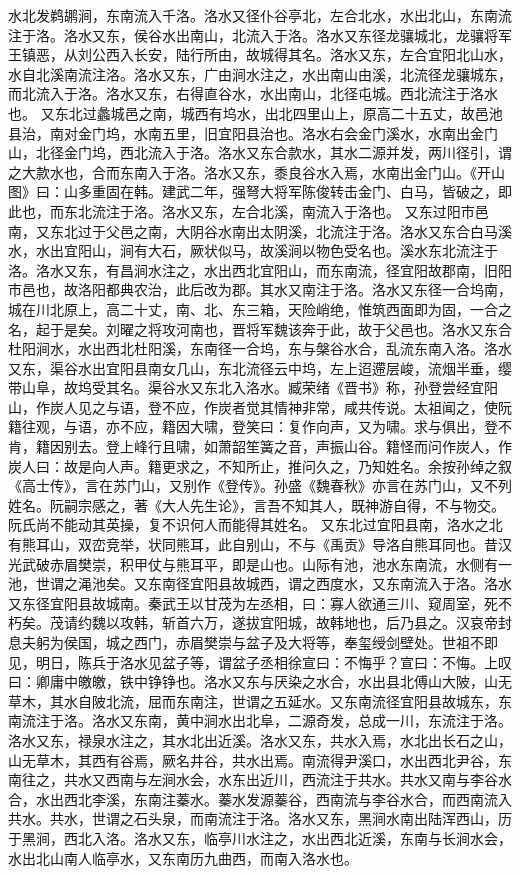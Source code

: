 \documentclass[12pt,UTF8]{ctexbook}
\begin{document}
水北发鹈鹕涧，东南流入千洛。洛水又径仆谷亭北，左合北水，水出北山，东南流注于洛。洛水又东，侯谷水出南山，北流入于洛。洛水又东径龙骧城北，龙骧将军王镇恶，从刘公西入长安，陆行所由，故城得其名。洛水又东，左合宜阳北山水，水自北溪南流注洛。洛水又东，广由涧水注之，水出南山由溪，北流径龙骧城东，而北流入于洛。洛水又东，右得直谷水，水出南山，北径屯城。西北流注于洛水也。
又东北过蠡城邑之南，城西有坞水，出北四里山上，原高二十五丈，故邑池县治，南对金门坞，水南五里，旧宜阳县治也。洛水右会金门溪水，水南出金门山，北径金门坞，西北流入于洛。洛水又东合款水，其水二源并发，两川径引，谓之大款水也，合而东南入于洛。洛水又东，黍良谷水入焉，水南出金门山。《开山图》曰：山多重固在韩。建武二年，强弩大将军陈俊转击金门、白马，皆破之，即此也，而东北流注于洛。洛水又东，左合北溪，南流入于洛也。
又东过阳市邑南，又东北过于父邑之南，大阴谷水南出太阴溪，北流注于洛。洛水又东合白马溪水，水出宜阳山，涧有大石，厥状似马，故溪涧以物色受名也。溪水东北流注于洛。洛水又东，有昌涧水注之，水出西北宜阳山，而东南流，径宜阳故郡南，旧阳市邑也，故洛阳都典农治，此后改为郡。其水又南注于洛。洛水又东径一合坞南，城在川北原上，高二十丈，南、北、东三箱，天险峭绝，惟筑西面即为固，一合之名，起于是矣。刘曜之将攻河南也，晋将军魏该奔于此，故于父邑也。洛水又东合杜阳涧水，水出西北杜阳溪，东南径一合坞，东与槃谷水合，乱流东南入洛。洛水又东，渠谷水出宜阳县南女几山，东北流径云中坞，左上迢遰层峻，流烟半垂，缨带山阜，故坞受其名。渠谷水又东北入洛水。臧荣绪《晋书》称，孙登尝经宜阳山，作炭人见之与语，登不应，作炭者觉其情神非常，咸共传说。太祖闻之，使阮籍往观，与语，亦不应，籍因大啸，登笑曰：复作向声，又为啸。求与俱出，登不肯，籍因别去。登上峰行且啸，如萧韶笙簧之音，声振山谷。籍怪而问作炭人，作炭人曰：故是向人声。籍更求之，不知所止，推问久之，乃知姓名。余按孙绰之叙《高士传》，言在苏门山，又别作《登传》。孙盛《魏春秋》亦言在苏门山，又不列姓名。阮嗣宗感之，著《大人先生论》，言吾不知其人，既神游自得，不与物交。阮氏尚不能动其英操，复不识何人而能得其姓名。
又东北过宜阳县南，洛水之北有熊耳山，双峦竞举，状同熊耳，此自别山，不与《禹贡》导洛自熊耳同也。昔汉光武破赤眉樊崇，积甲仗与熊耳平，即是山也。山际有池，池水东南流，水侧有一池，世谓之渑池矣。又东南径宜阳县故城西，谓之西度水，又东南流入于洛。洛水又东径宜阳县故城南。秦武王以甘茂为左丞相，曰：寡人欲通三川、窥周室，死不朽矣。茂请约魏以攻韩，斩首六万，遂拔宜阳城，故韩地也，后乃县之。汉哀帝封息夫躬为侯国，城之西门，赤眉樊崇与盆子及大将等，奉玺绶剑壁处。世祖不即见，明日，陈兵于洛水见盆子等，谓盆子丞相徐宣曰：不悔乎？宣曰：不悔。上叹曰：卿庸中皦皦，铁中铮铮也。洛水又东与厌染之水合，水出县北傅山大陂，山无草木，其水自陂北流，屈而东南注，世谓之五延水。又东南流径宜阳县故城东，东南流注于洛。洛水又东南，黄中涧水出北阜，二源奇发，总成一川，东流注于洛。洛水又东，禄泉水注之，其水北出近溪。洛水又东，共水入焉，水北出长石之山，山无草木，其西有谷焉，厥名井谷，共水出焉。南流得尹溪口，水出西北尹谷，东南往之，共水又西南与左涧水会，水东出近川，西流注于共水。共水又南与李谷水合，水出西北李溪，东南注蓁水。蓁水发源蓁谷，西南流与李谷水合，而西南流入共水。共水，世谓之石头泉，而南流注于洛。洛水又东，黑涧水南出陆浑西山，历于黑涧，西北入洛。洛水又东，临亭川水注之，水出西北近溪，东南与长涧水会，水出北山南人临亭水，又东南历九曲西，而南入洛水也。
\end{document}
